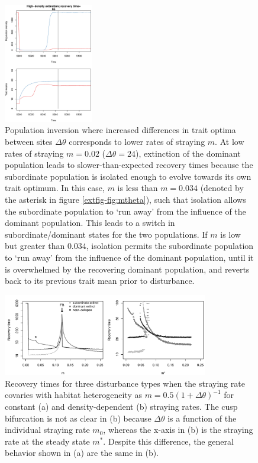 \documentclass{revtex4}
\begin{document}
\begin{figure}
  \captionsetup{justification=raggedright,
singlelinecheck=false
}
\centering
\includegraphics[width=0.35\textwidth]{fig_relax_inertia.pdf}
\caption{
Population inversion where increased differences in trait optima between sites $\Delta\theta$ corresponds to lower rates of straying $m$.
At low rates of straying $m=0.02$ ($\Delta\theta=24$), extinction of the dominant population leads to slower-than-expected recovery times because the subordinate population is isolated enough to evolve towards its own trait optimum. %
In this case, $m$ is less than $m=0.034$ (denoted by the asterisk in figure \ref{extfig-fig:mtheta}), such that isolation allows the subordinate population to `run away' from the influence of the dominant population.
This leads to a switch in subordinate/dominant states for the two populations.
If $m$ is low but greater than $0.034$, isolation permits the subordinate population to `run away' from the influence of the dominant population, until it is overwhelmed by the recovering dominant population, and reverts back to its previous trait mean prior to disturbance.
} \label{fig:inertia}
\end{figure}


\begin{figure}
  \captionsetup{justification=raggedright,
singlelinecheck=false
}
  \centering
  \includegraphics[width=0.8\textwidth]{fig_relax_mtheta.pdf}
  \caption{
  Recovery times for three disturbance types when the straying rate covaries with habitat heterogeneity as $m = 0.5(1 + \Delta\theta)^{-1}$ for constant (a) and density-dependent (b) straying rates.
  The cusp bifurcation is not as clear in (b) because $\Delta\theta$ is a function of the individual straying rate $m_0$, whereas the x-axis in (b) is the straying rate at the steady state $m^*$.
  Despite this difference, the general behavior shown in (a) are the same in (b).
  } \label{fig:mthetamvm}
\end{figure}
\end{document}

